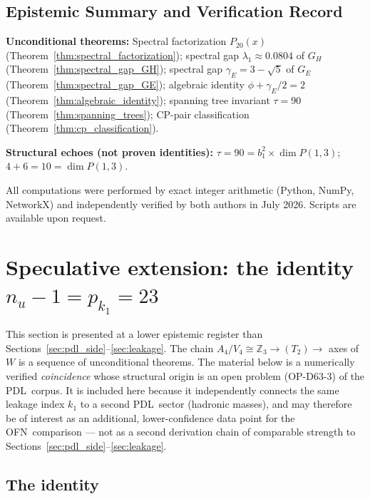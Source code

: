 \documentclass[11pt,a4paper]{article}
\theoremstyle{plain}
\theoremstyle{definition}
\theoremstyle{remark}
\newcommand{\PDL}{\textnormal{PDL}}
\newcommand{\OFN}{\textnormal{OFN}}
\newcommand{\Afour}{A_4}
\newcommand{\Vfour}{V_4}
\newcommand{\Zthree}{\mathbb{Z}_3}
\newcommand{\nuu}{n_u}
\newcommand{\kone}{k_1}
\newcommand{\pkone}{p_{k_1}}
\begin{document}
\subsection{Epistemic Summary and Verification Record}
\label{sec:ofn_epistemic}

\textbf{Unconditional theorems:} Spectral factorization $P_{20}(x)$ (Theorem~\ref{thm:spectral_factorization}); spectral gap $\lambda_1 \approx 0.0804$ of $G_H$ (Theorem~\ref{thm:spectral_gap_GH}); spectral gap $\gamma_E = 3 - \sqrt{5}$ of $G_E$ (Theorem~\ref{thm:spectral_gap_GE}); algebraic identity $\phi + \gamma_E/2 = 2$ (Theorem~\ref{thm:algebraic_identity}); spanning tree invariant $\tau = 90$ (Theorem~\ref{thm:spanning_trees}); CP-pair classification (Theorem~\ref{thm:cp_classification}).

\textbf{Structural echoes (not proven identities):} $\tau = 90 = b_1^2 \times \dim P(1,3)$; $4 + 6 = 10 = \dim P(1,3)$.

All computations were performed by exact integer arithmetic (Python, NumPy, NetworkX) and independently verified by both authors in July 2026. Scripts are available upon request.


\section{Speculative extension: the identity \texorpdfstring{$\nuu - 1 = \pkone = 23$}{nu - 1 = p k1 = 23}}
\label{sec:speculative}

\begin{speculativebox}
This section is presented at a lower epistemic register than Sections~\ref{sec:pdl_side}--\ref{sec:leakage}. The chain $\Afour/\Vfour \cong \Zthree \to (T_2) \to$ axes of $W$ is a sequence of unconditional theorems. The material below is a numerically verified \emph{coincidence} whose structural origin is an open problem (OP-D63-3) of the \PDL\ corpus. It is included here because it independently connects the same leakage index $\kone$ to a second \PDL\ sector (hadronic masses), and may therefore be of interest as an additional, lower-confidence data point for the \OFN\ comparison --- not as a second derivation chain of comparable strength to Sections~\ref{sec:pdl_side}--\ref{sec:leakage}.
\end{speculativebox}

\subsection{The identity}
\end{document}
